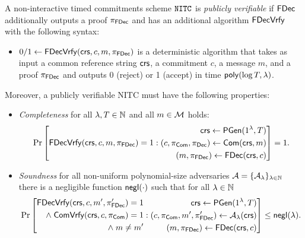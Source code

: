 \begin{definition}
\label{def:nitc_pubver}
A non-interactive timed commitments scheme $\mathtt{NITC}$ is \emph{publicly verifiable} if $\mathsf{FDec}$ additionally outputs a proof $\pi_{\mathsf{FDec}}$ and has an additional algorithm $\mathsf{FDecVrfy}$ with the following syntax:
\begin{itemize}
\item $0/1 \leftarrow \mathsf{FDecVrfy}(\mathsf{crs}, c, m, \pi_{\mathsf{FDec}})$ is a deterministic algorithm that takes as input a common reference string $\mathsf{crs}$, a commitment $c$, a message $m$, and a proof $\pi_{\mathsf{FDec}}$ and outputs 0 (reject) or 1 (accept) in time $\mathsf{poly}(\log T, \lambda)$.
\end{itemize}
Moreover, a publicly verifiable NITC must have the following properties:
\begin{itemize}
\item \emph{Completeness} for all $\lambda, T \in \mathbb{N}$ and all $m \in \mathcal{M}$ holds:
\[\Pr\left[
\begin{aligned}
\mathsf{FDecVrfy}(\mathsf{crs}, c, m, \pi_{\mathsf{FDec}})=1
\end{aligned}
: 
\begin{aligned}
      \mathsf{crs} \leftarrow \mathsf{PGen}(1{^{\lambda}}, T) \\
      (c, \pi_{\mathsf{Com}}, \pi_{\mathsf{Dec}}) \leftarrow \mathsf{Com}(\mathsf{crs}, m) \\
      (m, \pi_{\mathsf{FDec}}) \leftarrow \mathsf{FDec}(\mathsf{crs}, c) \\
    \end{aligned}
\right] = 1.
\]
\item \emph{Soundness} for all non-uniform polynomial-size adversaries $\mathcal{A} = \{\mathcal{A}_{\lambda}\}_{\lambda \in \mathbb{N}}$ there is a negligible function $\mathsf{negl}(\cdot)$ such that for all $\lambda \in \mathbb{N}$
\[\Pr\left[
\begin{aligned}
\mathsf{FDecVrfy}(\mathsf{crs}, c, m', \pi_{\mathsf{FDec}}') = 1 \\
 \land \; \mathsf{ComVrfy}(\mathsf{crs}, c, \pi_{\mathsf{Com}}) = 1 \\
\land \; m \neq m' \\
\end{aligned}
: 
\begin{aligned}
      \mathsf{crs} \leftarrow \mathsf{PGen}(1{^{\lambda}}, T) \\
      (c, \pi_{\mathsf{Com}}, m', \pi_{\mathsf{FDec}}') \leftarrow \mathcal{A}_{\lambda}(\mathsf{crs}) \\
      (m,\pi_{\mathsf{FDec}}) \leftarrow \mathsf{FDec}(\mathsf{crs},c)
    \end{aligned}
\right] \leq \mathsf{negl}(\lambda).
\]
\end{itemize}

\end{definition}

